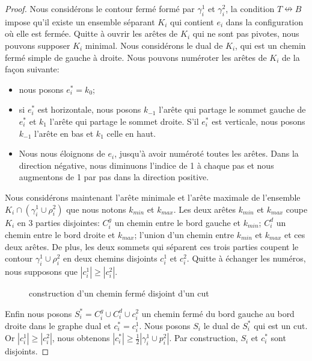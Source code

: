 \documentclass[titlepage,a4paper,12pt]{article}
\begin{document}
\begin{proof}
Nous considérons le contour fermé formé par $\gamma_i^1$ et $\gamma_i^2$, la condition $T\nleftrightarrow B$ impose qu'il existe un ensemble séparant $K_i$ qui contient $e_i$ dans la configuration où elle est fermée. Quitte à ouvrir les arêtes de $K_i$ qui ne sont pas pivotes, nous pouvons supposer $K_i$ minimal. Nous considérons le dual de $K_i$, qui est un chemin fermé simple de gauche à droite. Nous pouvons numéroter les arêtes de $K_i$ de la façon suivante:
\begin{itemize}[label = $\bullet$, leftmargin =*]
\item nous posons $e^*_i = k_0$;
\item si $e^*_i$ est horizontale, nous posons $k_{-1}$ l'arête qui partage le sommet gauche de $e^*_i$ et $k_1$ l'arête qui partage le sommet droite. S'il $e_i^*$ est verticale, nous posons $k_{-1}$ l'arête en bas et $k_1$ celle en haut.
\item Nous nous éloignons de $e_i$, jusqu'à avoir numéroté toutes les arêtes. Dans la direction négative, nous diminuons l'indice de 1 à chaque pas et nous augmentons de 1 par pas dans la direction positive.
\end{itemize}

Nous considérons maintenant l'arête minimale et l'arête maximale de l'ensemble $K_i\cap (\gamma_i^1\cup \rho_i^2)$ que nous notons $k_{min}$ et $k_{max}$. Les deux arêtes $k_{min}$ et $k_{max}$ coupe $K_i$ en 3 parties disjointes: $C^g_i$ un chemin entre le bord gauche et $k_{min}$; $C^d_i$ un chemin entre le bord droite et $k_{max}$; l'union d'un chemin entre $k_{min}$ et $k_{max}$ et ces deux arêtes. De plus, les deux sommets qui séparent ces trois parties coupent le contour $\gamma_i^1\cup \rho_i^2$ en deux chemins disjoints $c_i^1$ et $c_i^2$. Quitte à échanger les numéros, nous supposons que $|c_i^1| \geqslant |c_i^2|$.
\begin{figure}[h]
\center
{}
\caption{construction d'un chemin fermé disjoint d'un cut}
\end{figure}

Enfin nous posons $S^*_i = C^g_i \cup C^d_i \cup c_i^2$ un chemin fermé du bord gauche au bord droite dans le graphe dual et $c_i^* = c_i^1$. Nous posons $S_i$ le dual de $S^*_i$ qui est un cut. Or $|c_i^1| \geqslant |c_i^2|$, nous obtenons $|c^*_i| \geqslant \frac{1}{2}|\gamma_i^1\cup p_i^2|$. Par construction, $S_i$ et $c_i^*$ sont disjoints.
\end{proof}
\end{document}
